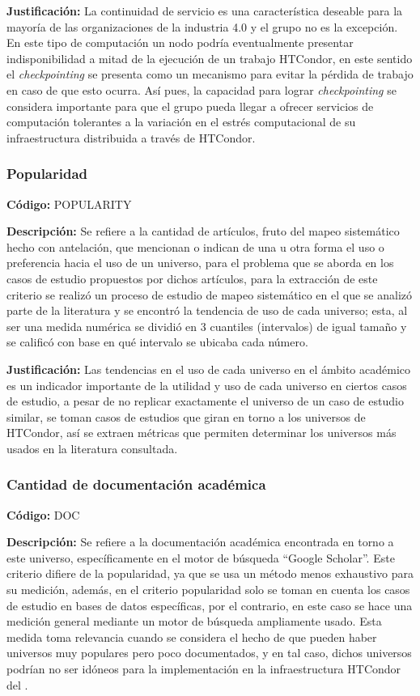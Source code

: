 \textbf{Justificación:} La continuidad de servicio es una característica deseable para la
mayoría de las organizaciones de la industria 4.0 y el grupo \GRID no es la
excepción. En este tipo de computación un nodo podría eventualmente presentar
indisponibilidad a mitad de la ejecución de un trabajo HTCondor, en este sentido el
\textit{checkpointing} se presenta como un mecanismo para evitar la pérdida de trabajo en
caso de que esto ocurra. Así pues, la capacidad para lograr \textit{checkpointing} se considera
importante para que el grupo \GRID pueda llegar a ofrecer servicios de computación
tolerantes a la variación en el estrés computacional de su infraestructura distribuida
a través de HTCondor.



\subsubsection{Popularidad}
\textbf{Código:} POPULARITY

\textbf{Descripción:} Se refiere a la cantidad de artículos, fruto del mapeo sistemático
hecho con antelación, que mencionan o indican de una u otra forma el uso o
preferencia hacia el uso de un universo, para el problema que se aborda en los
casos de estudio propuestos por dichos artículos, para la extracción de este
criterio se realizó un proceso de estudio de mapeo sistemático en el que
se analizó parte de la literatura y se encontró la tendencia de uso de cada
universo; esta, al ser una medida numérica se dividió en 3 cuantiles (intervalos) de igual
tamaño y se calificó con base en qué intervalo se ubicaba cada número.


\textbf{Justificación:} Las tendencias en el uso de cada universo en el ámbito académico
es un indicador importante de la utilidad y uso de cada universo en ciertos casos
de estudio, a pesar de no replicar exactamente el universo de un caso de estudio
similar, se toman casos de estudios que giran en torno a los universos de
HTCondor, así se extraen métricas que permiten determinar los universos más
usados en la literatura consultada.


\subsubsection{Cantidad de documentación académica}
\textbf{Código:} DOC

\textbf{Descripción:} Se refiere a la documentación académica encontrada en torno a
este universo, específicamente en el motor de búsqueda “Google Scholar”. Este
criterio difiere de la popularidad, ya que se usa un método menos exhaustivo para
su medición, además, en el criterio popularidad solo se toman en cuenta los casos
de estudio en bases de datos específicas, por el contrario, en este caso se hace
una medición general mediante un motor de búsqueda ampliamente usado. Esta medida
toma relevancia cuando se considera el hecho de que pueden haber universos
muy populares pero poco documentados, y en tal caso, dichos universos podrían
no ser idóneos para la implementación en la infraestructura HTCondor del \GRID.


